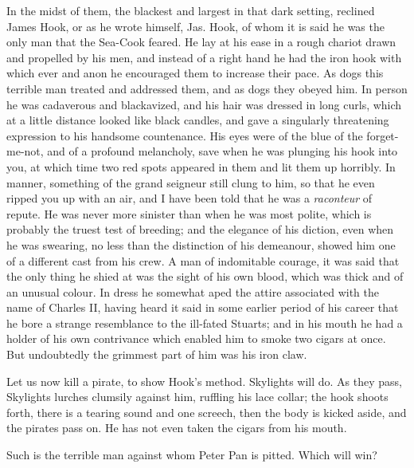 In the midst of them, the blackest and largest in that dark setting, reclined
James Hook, or as he wrote himself, Jas. Hook, of whom it is said he was the
only man that the Sea-Cook feared.
He lay at his ease in a rough chariot drawn and propelled by his men, and
instead of a right hand he had the iron hook with which ever and anon he
encouraged them to increase their pace.
As dogs this terrible man treated and addressed them, and as dogs they obeyed
him.
In person he was cadaverous and blackavized, and his hair was dressed in long
curls, which at a little distance looked like black candles, and gave a
singularly threatening expression to his handsome countenance.
His eyes were of the blue of the forget-me-not, and of a profound melancholy,
save when he was plunging his hook into you, at which time two red spots
appeared in them and lit them up horribly.
In manner, something of the grand seigneur still clung to him, so that he even
ripped you up with an air, and I have been told that he was a \emph{raconteur}
of repute.
He was never more sinister than when he was most polite, which is probably the
truest test of breeding; and the elegance of his diction, even when he was
swearing, no less than the distinction of his demeanour, showed him one of a
different cast from his crew.
A man of indomitable courage, it was said that the only thing he shied at was
the sight of his own blood, which was thick and of an unusual colour.
In dress he somewhat aped the attire associated with the name of Charles II,
having heard it said in some earlier period of his career that he bore a strange
resemblance to the ill-fated Stuarts; and in his mouth he had a holder of his
own contrivance which enabled him to smoke two cigars at once.
But undoubtedly the grimmest part of him was his iron claw.

Let us now kill a pirate, to show Hook's method.
Skylights will do.
As they pass, Skylights lurches clumsily against him, ruffling his lace collar;
the hook shoots forth, there is a tearing sound and one screech, then the body
is kicked aside, and the pirates pass on.
He has not even taken the cigars from his mouth.

Such is the terrible man against whom Peter Pan is pitted.
Which will win?

